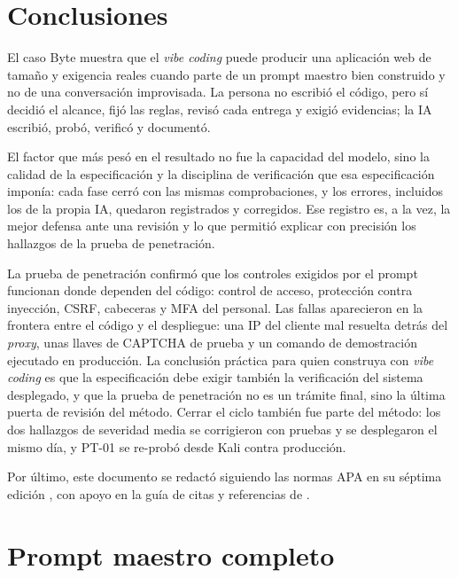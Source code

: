 \documentclass[stu,12pt,floatsintext]{apa7}
\begin{document}
\section{Conclusiones}

El caso Byte muestra que el \textit{vibe coding} puede producir una aplicación web de tamaño y exigencia
reales cuando parte de un prompt maestro bien construido y no de una conversación improvisada. La persona
no escribió el código, pero sí decidió el alcance, fijó las reglas, revisó cada entrega y exigió
evidencias; la IA escribió, probó, verificó y documentó.

El factor que más pesó en el resultado no fue la capacidad del modelo, sino la calidad de la
especificación y la disciplina de verificación que esa especificación imponía: cada fase cerró con las
mismas comprobaciones, y los errores, incluidos los de la propia IA, quedaron registrados y corregidos.
Ese registro es, a la vez, la mejor defensa ante una revisión y lo que permitió explicar con precisión
los hallazgos de la prueba de penetración.

La prueba de penetración confirmó que los controles exigidos por el prompt funcionan donde dependen del
código: control de acceso, protección contra inyección, CSRF, cabeceras y MFA del personal. Las fallas
aparecieron en la frontera entre el código y el despliegue: una IP del cliente mal resuelta detrás del
\textit{proxy}, unas llaves de CAPTCHA de prueba y un comando de demostración ejecutado en producción. La conclusión práctica
para quien construya con \textit{vibe coding} es que la especificación debe exigir también la
verificación del sistema desplegado, y que la prueba de penetración no es un trámite final, sino la
última puerta de revisión del método. Cerrar el ciclo también fue parte del método: los dos hallazgos
de severidad media se corrigieron con pruebas y se desplegaron el mismo día, y PT-01 se re-probó desde
Kali contra producción.

Por último, este documento se redactó siguiendo las normas APA en su séptima edición
\parencite{apa2020}, con apoyo en la guía de citas y referencias de \textcite{menendez2020}.

\printbibliography

\appendix

\section{Prompt maestro completo}
\label{ap:prompt}
\end{document}
